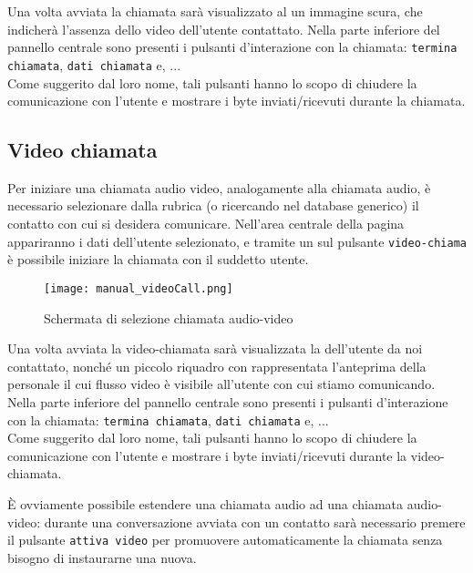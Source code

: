 Una volta avviata la chiamata sarà visualizzato al un immagine scura, che indicherà l'assenza dello  video dell'utente contattato. 
Nella parte inferiore del pannello centrale sono presenti i pulsanti d'interazione con la chiamata: \texttt{termina chiamata}, \texttt{dati chiamata} e, ...\\
Come suggerito dal loro nome, tali pulsanti hanno lo scopo di chiudere la comunicazione con l'utente e mostrare i byte inviati/ricevuti durante la chiamata.


\subsection{Video chiamata}
Per iniziare una chiamata audio video, analogamente alla chiamata audio, è necessario selezionare dalla rubrica (o ricercando nel database generico) il contatto con cui si desidera comunicare. Nell'area centrale della pagina appariranno i dati dell'utente selezionato, e tramite un  sul pulsante 
\texttt{video-chiama} è possibile iniziare la chiamata con il suddetto utente.

\begin{figure}[H]
  \texttt{[image: manual\_videoCall.png]}
\caption{Schermata di selezione chiamata audio-video}\label{fig:videoCall}
\end{figure}

Una volta avviata la video-chiamata sarà visualizzata la  dell'utente da noi contattato, nonché un piccolo riquadro con rappresentata l'anteprima della  personale il cui flusso video è visibile all'utente con cui stiamo comunicando. 
Nella parte inferiore del pannello centrale sono presenti i pulsanti d'interazione con la chiamata: \texttt{termina chiamata}, \texttt{dati chiamata} e, ...\\
Come suggerito dal loro nome, tali pulsanti hanno lo scopo di chiudere la comunicazione con l'utente e mostrare i byte inviati/ricevuti durante la video-chiamata.

È ovviamente possibile estendere una chiamata audio ad una chiamata audio-video: durante una conversazione avviata con un contatto sarà necessario premere il pulsante \texttt{attiva video} per promuovere automaticamente la chiamata senza bisogno di instaurarne una nuova.



